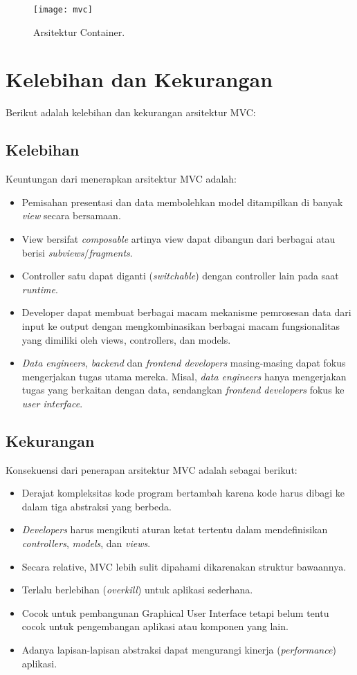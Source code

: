 \begin{figure}[h]
    \centering
    \texttt{[image: mvc]}
    \caption{Arsitektur Container.}
    \label{fig:mvc}
\end{figure}

\section{Kelebihan dan Kekurangan}
Berikut adalah kelebihan dan kekurangan arsitektur MVC:


\subsection{Kelebihan}
Keuntungan dari menerapkan arsitektur MVC adalah:
\begin{itemize}
\item Pemisahan presentasi dan data membolehkan model ditampilkan di banyak \textit{view} secara bersamaan.
\item View bersifat \textit{composable} artinya view dapat dibangun dari berbagai atau berisi \textit{subviews}/\textit{fragments}.
\item Controller satu dapat diganti (\textit{switchable}) dengan controller lain pada saat \textit{runtime}.
\item Developer dapat membuat berbagai macam mekanisme pemrosesan data dari input ke output dengan mengkombinasikan berbagai macam fungsionalitas yang dimiliki oleh views, controllers, dan models.
\item \textit{Data engineers}, \textit{backend} dan \textit{frontend developers} masing-masing dapat fokus mengerjakan tugas utama mereka. 
Misal, \textit{data engineers} hanya mengerjakan tugas yang berkaitan dengan data, sendangkan \textit{frontend developers} fokus ke \textit{user interface}.
\end{itemize}

\subsection{Kekurangan}
Konsekuensi dari penerapan arsitektur MVC adalah sebagai berikut:
\begin{itemize}
\item Derajat kompleksitas kode program bertambah karena kode harus dibagi ke dalam tiga abstraksi yang berbeda.
\item \textit{Developers} harus mengikuti aturan ketat tertentu dalam mendefinisikan \textit{controllers}, \textit{models}, dan \textit{views}. 
\item Secara relative, MVC lebih sulit dipahami dikarenakan struktur bawaannya.
\item Terlalu berlebihan (\textit{overkill}) untuk aplikasi sederhana.
\item Cocok untuk pembangunan Graphical User Interface tetapi belum tentu cocok untuk pengembangan aplikasi atau komponen yang lain. 
\item Adanya lapisan-lapisan abstraksi dapat mengurangi kinerja (\textit{performance}) aplikasi.
\end{itemize}

